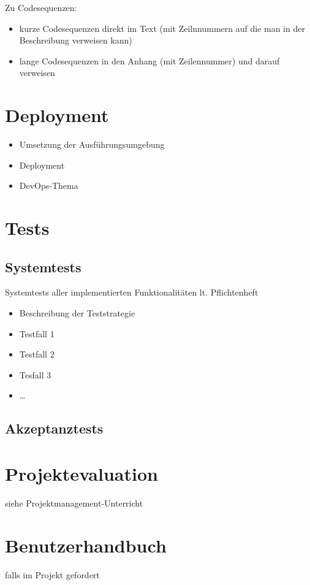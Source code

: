 Zu Codesequenzen:
\begin{itemize}
	\item kurze Codesequenzen direkt im Text (mit Zeilnnummern auf die man in der Beschreibung verweisen kann)
	\item lange Codesequenzen in den Anhang (mit Zeilennummer) und darauf verweisen
\end{itemize}

\chapter{Deployment}
\begin{itemize}
	\item Umsetzung der Ausführungsumgebung
	\item Deployment
	\item DevOps-Thema
\end{itemize}

\chapter{Tests}

\section{Systemtests}
Systemtests aller implementierten Funktionalitäten lt. Pflichtenheft
\begin{itemize}
	\item Beschreibung der Teststrategie
	\item Testfall 1
	\item Testfall 2
	\item Tesfall 3
	\item …
\end{itemize}

\section{Akzeptanztests}

\chapter{Projektevaluation}
siehe Projektmanagement-Unterricht

\chapter{Benutzerhandbuch}
falls im Projekt gefordert

